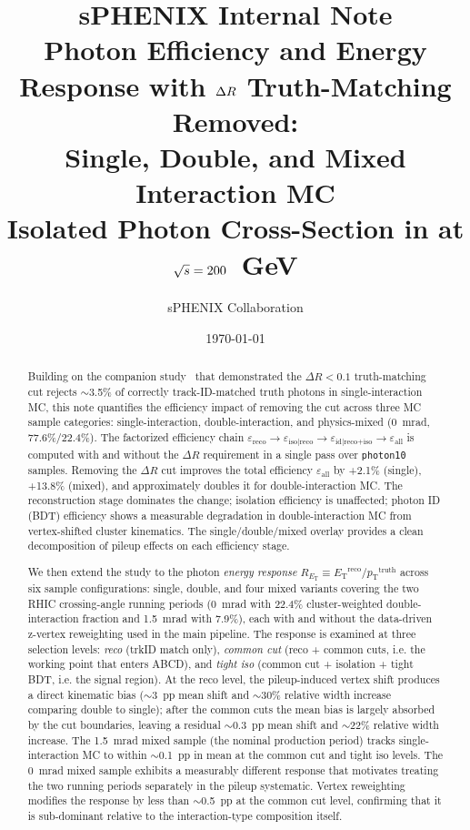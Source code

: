 \documentclass[11pt,letterpaper]{article}
\title{%
  \vspace{-1cm}
  {\large \textbf{sPHENIX Internal Note}}\\[0.5cm]
  {\LARGE \textbf{Photon Efficiency and Energy Response with $\DR$ Truth-Matching Removed:\\
  Single, Double, and Mixed Interaction MC}}\\[0.3cm]
  {\large Isolated Photon Cross-Section in \pp{} at $\mbox{$\sqrt{s}$} = 200$~GeV}
}
\author{sPHENIX Collaboration}
\date{\today}
\newcommand{\DR}{\ensuremath{\Delta R}}
\newcommand{\pT}{\ensuremath{p_{\text{T}}}}
\newcommand{\ET}{\ensuremath{E_{\text{T}}}}
\newcommand{\ereco}{\ensuremath{\varepsilon_{\text{reco}}}}
\newcommand{\eiso}{\ensuremath{\varepsilon_{\text{iso}|\text{reco}}}}
\newcommand{\eid}{\ensuremath{\varepsilon_{\text{id}|\text{reco+iso}}}}
\newcommand{\eall}{\ensuremath{\varepsilon_{\text{all}}}}
\begin{document}
\maketitle

\begin{abstract}
Building on the companion study~\cite{dr_study} that demonstrated the
$\DR < 0.1$ truth-matching cut rejects $\sim$3.5\% of correctly
track-ID-matched truth photons in single-interaction MC, this note quantifies
the efficiency impact of removing the cut across three MC sample categories:
single-interaction, double-interaction, and physics-mixed (0~mrad, 77.6\%/22.4\%).
The factorized efficiency chain
$\ereco \to \eiso \to \eid \to \eall$ is computed with and without the $\DR$
requirement in a single pass over \texttt{photon10} samples. Removing the $\DR$
cut improves the total efficiency $\eall$ by +2.1\% (single), +13.8\% (mixed),
and approximately doubles it for double-interaction MC. The reconstruction stage
dominates the change; isolation efficiency is unaffected; photon ID (BDT)
efficiency shows a measurable degradation in double-interaction MC from
vertex-shifted cluster kinematics. The single/double/mixed overlay provides a
clean decomposition of pileup effects on each efficiency stage.

We then extend the study to the photon \emph{energy response}
$R_{\ET} \equiv \ET^{\text{reco}} / \pT^{\text{truth}}$ across six sample
configurations: single, double, and four mixed variants covering the two RHIC
crossing-angle running periods (0~mrad with 22.4\% cluster-weighted
double-interaction fraction and 1.5~mrad with 7.9\%), each with and without
the data-driven z-vertex reweighting used in the main pipeline.
The response is examined at three selection levels: \emph{reco}
(trkID match only), \emph{common cut} (reco + common cuts, i.e. the working
point that enters ABCD), and \emph{tight iso} (common cut + isolation +
tight BDT, i.e. the signal region).
At the reco level, the pileup-induced vertex shift produces a direct
kinematic bias ($\sim$3~pp mean shift and $\sim$30\% relative width increase
comparing double to single); after the common cuts the mean bias is largely
absorbed by the cut boundaries, leaving a residual $\sim$0.3~pp mean shift
and $\sim$22\% relative width increase. The 1.5~mrad mixed sample (the
nominal production period) tracks single-interaction MC to within $\sim$0.1~pp
in mean at the common cut and tight iso levels. The 0~mrad mixed sample
exhibits a measurably different response that motivates treating the two
running periods separately in the pileup systematic. Vertex reweighting
modifies the response by less than $\sim$0.5~pp at the common cut level,
confirming that it is sub-dominant relative to the interaction-type
composition itself.
\end{abstract}
\end{document}
